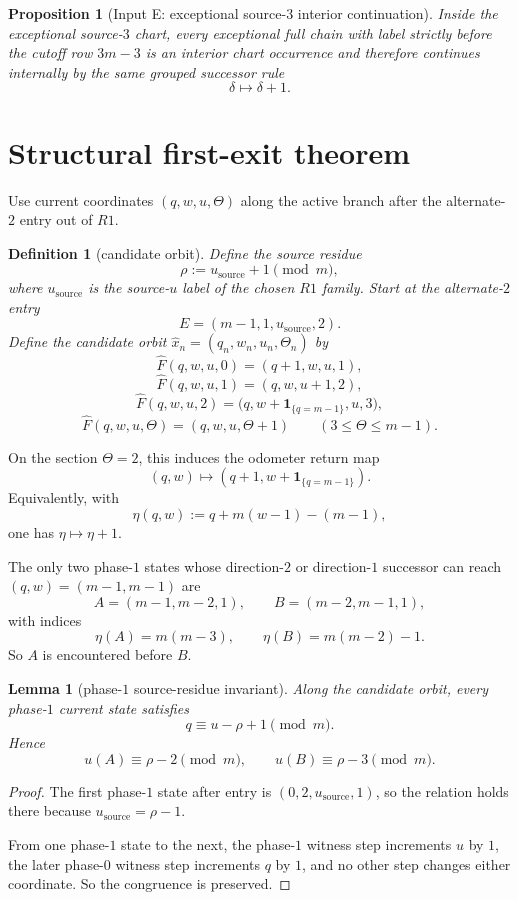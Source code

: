 \documentclass[11pt]{article}
\newtheorem{proposition}[theorem]{Proposition}
\newtheorem{definition}[theorem]{Definition}
\newtheorem{lemma}[theorem]{Lemma}
\newcommand{\one}[1]{\mathbf 1_{\{#1\}}}
\begin{document}
\begin{proposition}[Input E: exceptional source-$3$ interior continuation]
Inside the exceptional source-$3$ chart, every exceptional full chain with
label strictly before the cutoff row $3m-3$ is an interior chart occurrence and
therefore continues internally by the same grouped successor rule
\[
\delta\mapsto \delta+1.
\]
\end{proposition}

\section{Structural first-exit theorem}

Use current coordinates $(q,w,u,\Theta)$ along the active branch after the
alternate-$2$ entry out of $R1$.

\begin{definition}[candidate orbit]
Define the source residue
\[
\rho:=u_{\mathrm{source}}+1 \pmod m,
\]
where $u_{\mathrm{source}}$ is the source-$u$ label of the chosen $R1$ family.
Start at the alternate-$2$ entry
\[
E=(m-1,1,u_{\mathrm{source}},2).
\]
Define the candidate orbit $\widehat x_n=(q_n,w_n,u_n,\Theta_n)$ by
\[
\widehat F(q,w,u,0)=(q+1,w,u,1),
\]
\[
\widehat F(q,w,u,1)=(q,w,u+1,2),
\]
\[
\widehat F(q,w,u,2)=\bigl(q,w+\one{q=m-1},u,3\bigr),
\]
\[
\widehat F(q,w,u,\Theta)=(q,w,u,\Theta+1)
\qquad (3\le \Theta\le m-1).
\]
\end{definition}

On the section $\Theta=2$, this induces the odometer return map
\[
(q,w)\mapsto (q+1,w+\one{q=m-1}).
\]
Equivalently, with
\[
\eta(q,w):=q+m(w-1)-(m-1),
\]
one has $\eta\mapsto \eta+1$.

The only two phase-$1$ states whose direction-$2$ or direction-$1$ successor can
reach $(q,w)=(m-1,m-1)$ are
\[
A=(m-1,m-2,1),
\qquad
B=(m-2,m-1,1),
\]
with indices
\[
\eta(A)=m(m-3),
\qquad
\eta(B)=m(m-2)-1.
\]
So $A$ is encountered before $B$.

\begin{lemma}[phase-$1$ source-residue invariant]
Along the candidate orbit, every phase-$1$ current state satisfies
\[
q\equiv u-\rho+1 \pmod m.
\]
Hence
\[
u(A)\equiv \rho-2 \pmod m,
\qquad
u(B)\equiv \rho-3 \pmod m.
\]
\end{lemma}

\begin{proof}
The first phase-$1$ state after entry is $(0,2,u_{\mathrm{source}},1)$, so the
relation holds there because $u_{\mathrm{source}}=\rho-1$.

From one phase-$1$ state to the next, the phase-$1$ witness step increments $u$
by $1$, the later phase-$0$ witness step increments $q$ by $1$, and no other
step changes either coordinate. So the congruence is preserved.
\end{proof}
\end{document}
